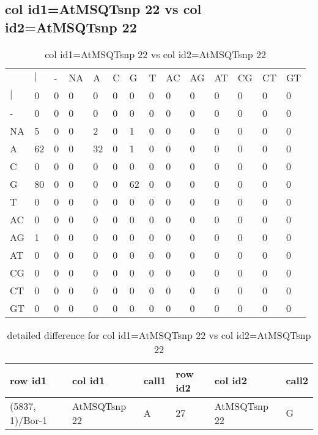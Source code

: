 \subsection{col id1=AtMSQTsnp 22 vs col id2=AtMSQTsnp 22}
\begin{center}
\begin{longtable}{|l|l|l|l|l|l|l|l|l|l|l|l|l|l|}
\caption{col id1=AtMSQTsnp 22 vs col id2=AtMSQTsnp 22} \label{table_dm588}\\
\hline
\\
\hline
&$|$&-&NA&A&C&G&T&AC&AG&AT&CG&CT&GT\\
$|$&0&0&0&0&0&0&0&0&0&0&0&0&0\\
-&0&0&0&0&0&0&0&0&0&0&0&0&0\\
NA&5&0&0&2&0&1&0&0&0&0&0&0&0\\
A&62&0&0&32&0&1&0&0&0&0&0&0&0\\
C&0&0&0&0&0&0&0&0&0&0&0&0&0\\
G&80&0&0&0&0&62&0&0&0&0&0&0&0\\
T&0&0&0&0&0&0&0&0&0&0&0&0&0\\
AC&0&0&0&0&0&0&0&0&0&0&0&0&0\\
AG&1&0&0&0&0&0&0&0&0&0&0&0&0\\
AT&0&0&0&0&0&0&0&0&0&0&0&0&0\\
CG&0&0&0&0&0&0&0&0&0&0&0&0&0\\
CT&0&0&0&0&0&0&0&0&0&0&0&0&0\\
GT&0&0&0&0&0&0&0&0&0&0&0&0&0\\
\hline
\end{longtable}
\end{center}

\begin{center}
\begin{longtable}{|l|l|l|l|l|l|}
\caption{detailed difference for col id1=AtMSQTsnp 22 vs col id2=AtMSQTsnp 22} \label{table_dm589}\\
\hline
row id1&col id1&call1&row id2&col id2&call2\\
\hline
(5837, 1)/Bor-1&AtMSQTsnp 22&A&27&AtMSQTsnp 22&G\\
\hline
\end{longtable}
\end{center}


